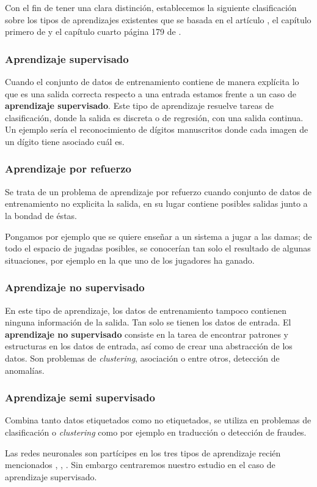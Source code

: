 Con el fin de tener una clara distinción,
establecemos la siguiente clasificación sobre los tipos de aprendizajes existentes 
que se basada en el
artículo \cite{importancia-arte-aprendizaje-automatico},
 el capítulo primero de  \cite{MostafaLearningFromData}
 y el capítulo cuarto   página 179 de
\cite{BishopPaterRecognition}.

\subsubsection{Aprendizaje supervisado}
Cuando el conjunto de datos de entrenamiento contiene de manera explícita lo que es una salida correcta respecto a una entrada estamos frente a un caso de \textbf{aprendizaje supervisado}.   
Este tipo de aprendizaje resuelve tareas de clasificación, donde la salida es discreta 
o de regresión, con una salida continua.
Un ejemplo sería el reconocimiento de dígitos  manuscritos donde cada imagen de un dígito tiene asociado cuál es. 



\subsubsection{Aprendizaje por refuerzo}  
Se trata de un problema de aprendizaje por refuerzo 
cuando conjunto de datos de entrenamiento no explicita la salida, en su lugar contiene posibles salidas junto a la bondad de éstas. 

Pongamos por ejemplo que se quiere enseñar a un sistema a jugar
a las damas; de todo el espacio de jugadas posibles, se conocerían tan solo el resultado de algunas situaciones, por ejemplo en la que uno de los jugadores ha ganado.  


\subsubsection{Aprendizaje no supervisado}  

En este tipo de aprendizaje, los datos de entrenamiento tampoco contienen ninguna información de la salida.
 Tan solo se tienen los datos de entrada. El \textbf{aprendizaje no supervisado} 
 consiste en la tarea de encontrar patrones y estructuras en los datos de entrada, 
 así como de crear una abstracción de los datos.  Son problemas de \textit{clustering}, asociación o entre otros, detección de anomalías.

\subsubsection{Aprendizaje semi supervisado }
Combina tanto datos etiquetados como no etiquetados, 
se utiliza en problemas de clasificación o \textit{clustering}
como por ejemplo en traducción o detección de fraudes.


Las redes neuronales son partícipes en los tres tipos de aprendizaje 
recién mencionados
\cite{8612259}, \cite{DBLP:journals/corr/BakerGNR16}, \cite{10.5555/2955491.2955578}. Sin embargo centraremos nuestro estudio en el caso 
de aprendizaje supervisado. 


